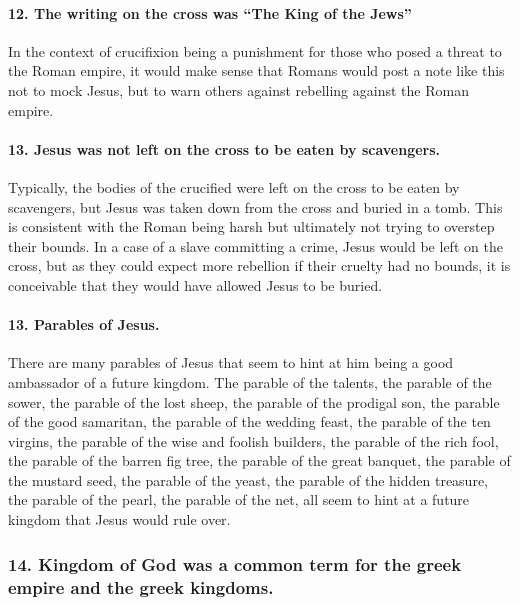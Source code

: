 \paragraph{12.
The writing on the cross was ``The King of the Jews''}\label{par:the-writing-on-the-cross-was-the-king-of-the-jews}

In the context of crucifixion being a punishment for those who posed a threat to the Roman empire, it would make sense that Romans would post a note like this not to mock Jesus, but to warn others against rebelling against the Roman empire.

\paragraph{13.
Jesus was not left on the cross to be eaten by scavengers.}\label{par:jesus-was-not-left-on-the-cross-to-be-eaten-by-scavengers.}

Typically, the bodies of the crucified were left on the cross to be eaten by scavengers, but Jesus was taken down from the cross and buried in a tomb.
This is consistent with the Roman being harsh but ultimately not trying to overstep their bounds.
In a case of a slave committing a crime, Jesus would be left on the cross, but as they could expect more rebellion if their cruelty had no bounds, it is conceivable that they would have allowed Jesus to be buried.

\paragraph{13.
Parables of Jesus.}\label{par:parables-of-jesus.}

There are many parables of Jesus that seem to hint at him being a good ambassador of a future kingdom.
The parable of the talents, the parable of the sower, the parable of the lost sheep, the parable of the prodigal son, the parable of the good samaritan, the parable of the wedding feast, the parable of the ten virgins, the parable of the wise and foolish builders, the parable of the rich fool, the parable of the barren fig tree, the parable of the great banquet, the parable of the mustard seed, the parable of the yeast, the parable of the hidden treasure, the parable of the pearl, the parable of the net, all seem to hint at a future kingdom that Jesus would rule over.

\subsubsection{14.
Kingdom of God was a common term for the greek empire and the greek kingdoms.}\label{par:kingdom-of-god-was-a-common-term-for-the-greek-empire-and-the-greek-kingdoms.}

